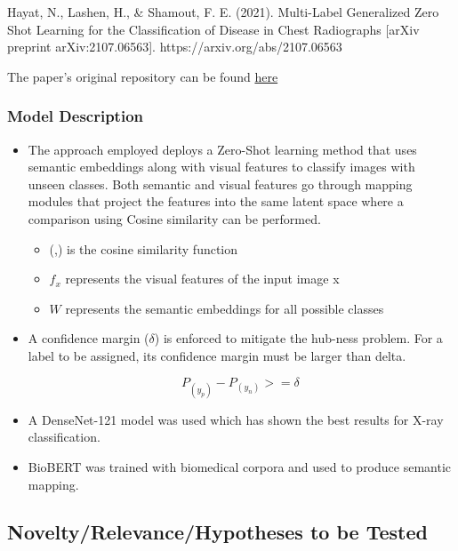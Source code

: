 \documentclass[letterpaper]{article} %
\begin{document}
Hayat, N., Lashen, H., \& Shamout, F. E. (2021). Multi-Label Generalized Zero Shot Learning
for the Classification of Disease in Chest Radiographs [arXiv preprint arXiv:2107.06563].
https://arxiv.org/abs/2107.06563

The paper's original repository can be found \href{https://github.com/nyuad-cai/CXR-ML-GZSL?tab=readme-ov-file#Model-training}{here}

\subsubsection{Model Description}

\begin{itemize}

\item The approach employed deploys a Zero-Shot learning method that uses semantic embeddings along with 
        visual features to classify images with unseen classes. Both semantic and visual features go through                    mapping modules that project the features into the same latent space where a comparison using Cosine            similarity can be performed.
\begin{itemize}
\[P^x_C = (f_x,W)\]
where
\item (,) is the cosine similarity function
\item \(f_x\) represents the visual features of the input image x
\item \(W\) represents the semantic embeddings for all possible classes


\end{itemize}


\item A confidence margin (\( \delta \)) is enforced to mitigate the hub-ness problem. For a label to be assigned, its 
        confidence margin must be larger than delta. 
    \begin{itemize}

\[P_(y_p) - P_(y_n) >= \delta\ \]

    \end{itemize}
    \item A DenseNet-121 model was used which has shown the best results for X-ray classification.
    \item BioBERT was trained with biomedical corpora and used to produce semantic mapping.
\end{itemize}

\subsection{Novelty/Relevance/Hypotheses to be Tested}
\end{document}
